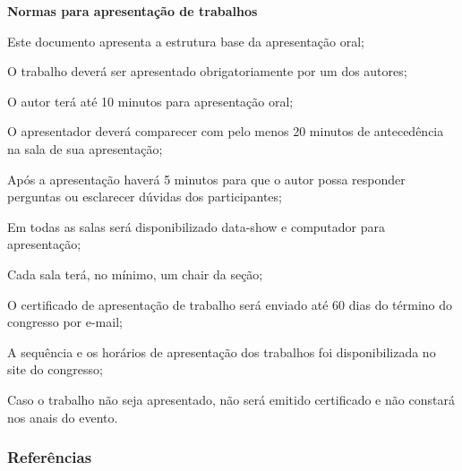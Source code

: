 \documentclass[18pt]{beamer}
\begin{document}
\begin{frame}[allowframebreaks] {\fontsize{20pt}{20}\selectfont \textbf{Normas para apresentação de trabalhos}}

\begin{itemize}
{\fontsize{11pt}{11}\selectfont
    \item Este documento apresenta a estrutura base da apresentação oral;
    \item O trabalho deverá ser apresentado obrigatoriamente por um dos autores;
    \item O autor terá até 10 minutos para apresentação oral;
    \item O apresentador deverá comparecer com pelo menos 20 minutos de antecedência na sala de sua apresentação;
    \item Após a apresentação haverá 5 minutos para que o autor possa responder perguntas ou esclarecer dúvidas dos participantes;
    
    \framebreak
        
    \item Em todas as salas será disponibilizado data-show e computador para apresentação;
    \item Cada sala terá, no mínimo, um chair da seção;
    \item O certificado de apresentação de trabalho será enviado até 60 dias do término do congresso por e-mail;
    \item A sequência e os horários de apresentação dos trabalhos foi disponibilizada no site do congresso;
    \item Caso o trabalho não seja apresentado, não será emitido certificado e não constará  nos anais do evento.}
\end{itemize}

\end{frame}

\nocite{*}
\begin{frame}[allowframebreaks] 
\frametitle{\fontsize{20pt}{20}\selectfont \textbf{Referências}}
{\scriptsize


}
\end{frame}



\end{document}
